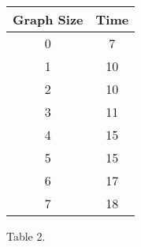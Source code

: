 \begin{center}
\begin{tabular}{c c}
\toprule \toprule
\hspace{100px} Graph Size \hspace{90px} & \hspace{100px} Time \hspace{90px} \\
\midrule \midrule
0 & 7 \\
\midrule
1 & 10 \\
\midrule
2 & 10 \\
\midrule
3 & 11 \\
\midrule
4 & 15 \\
\midrule
5 & 15 \\
\midrule
6 & 17 \\
\midrule
7 & 18 \\
\bottomrule
\end{tabular}
\centering \linebreak \linebreak Table 2.
\end{center}

\pagebreak